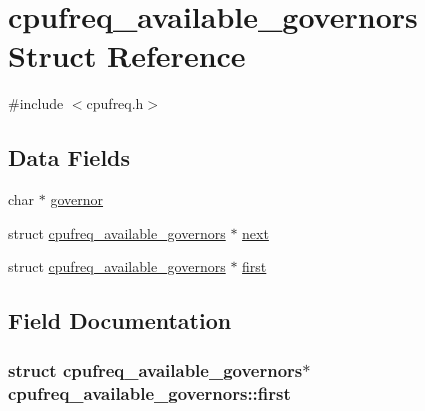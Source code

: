 \hypertarget{structcpufreq__available__governors}{}\section{cpufreq\+\_\+available\+\_\+governors Struct Reference}
\label{structcpufreq__available__governors}


{\ttfamily \#include $<$cpufreq.\+h$>$}

\subsection*{Data Fields}
\begin{DoxyCompactItemize}
\item 
char $\ast$ \hyperlink{structcpufreq__available__governors_addce0fc786b4df6bd024fb58c7466d64}{governor}
\item 
struct \hyperlink{structcpufreq__available__governors}{cpufreq\+\_\+available\+\_\+governors} $\ast$ \hyperlink{structcpufreq__available__governors_a93d6af680621259a45cca02a509de44d}{next}
\item 
struct \hyperlink{structcpufreq__available__governors}{cpufreq\+\_\+available\+\_\+governors} $\ast$ \hyperlink{structcpufreq__available__governors_aa4a79389742e7ce24da79278a70be602}{first}
\end{DoxyCompactItemize}


\subsection{Field Documentation}
\subsubsection[{\texorpdfstring{first}{first}}]{\setlength{\rightskip}{0pt plus 5cm}struct {\bf cpufreq\+\_\+available\+\_\+governors}$\ast$ cpufreq\+\_\+available\+\_\+governors\+::first}\hypertarget{structcpufreq__available__governors_aa4a79389742e7ce24da79278a70be602}{}\label{structcpufreq__available__governors_aa4a79389742e7ce24da79278a70be602}
